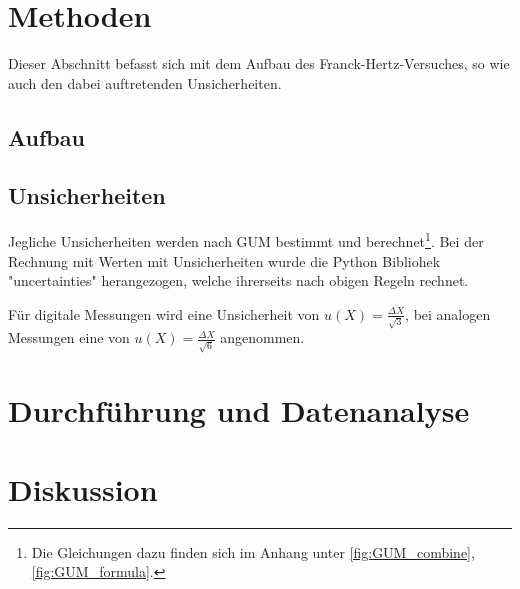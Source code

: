 \section{Methoden}
	
	Dieser Abschnitt befasst sich mit dem Aufbau des Franck-Hertz-Versuches, so wie auch den dabei auftretenden Unsicherheiten.
	
	\subsection{Aufbau}	
		
	\subsection{Unsicherheiten}
	
		Jegliche Unsicherheiten werden nach GUM bestimmt und berechnet\footnote{Die Gleichungen dazu finden sich im Anhang unter \ref{fig:GUM_combine}, \ref{fig:GUM_formula}.}.
		Bei der Rechnung mit Werten mit Unsicherheiten wurde die Python Bibliohek "uncertainties" herangezogen, welche ihrerseits nach obigen Regeln rechnet.
	
		Für digitale Messungen wird eine Unsicherheit von $u(X) = \frac{\Delta X}{\sqrt{3}}$, bei analogen Messungen eine von $u(X) = \frac{\Delta X}{\sqrt{6}}$ angenommen.

\section{Durchführung und Datenanalyse}

\section{Diskussion}
